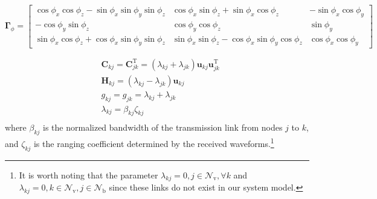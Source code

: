 \documentclass{IEEEtran}
\begin{document}
\begin{figure*}[!t]
\begin{equation}\label{eq13}
\boldsymbol{\Gamma}_{\phi}=
\begin{bmatrix}
\cos{\phi_x}\cos{\phi_z}-\sin{\phi_x}\sin{\phi_y}\sin{\phi_z} & \cos{\phi_x}\sin{\phi_z}+ \sin{\phi_x}\cos{\phi_z} & -\sin{\phi_x}\cos{\phi_y}\\
-\cos{\phi_y}\sin{\phi_z} & \cos{\phi_y}\cos{\phi_z} & \sin{\phi_y}\\
\sin{\phi_x}\cos{\phi_z}+ \cos{\phi_x}\sin{\phi_y}\sin{\phi_z}& \sin{\phi_x}\sin{\phi_z}- \cos{\phi_x}\sin{\phi_y}\cos{\phi_z} & \cos{\phi_x}\cos{\phi_y}
\end{bmatrix}
\end{equation}
\hrulefill
\vspace*{4pt}
\end{figure*}
\begin{equation}
\begin{aligned}
&\mathbf{C}_{kj}=\mathbf{C}_{jk}^{\text{T}}=(\lambda_{kj}+\lambda_{jk})\mathbf{u}_{kj}\mathbf{u}_{jk}^{\text{T}} \\
&\mathbf{H}_{kj}=(\lambda_{kj}-\lambda_{jk})\mathbf{u}_{kj}\\
&g_{kj}=g_{jk}=\lambda_{kj}+\lambda_{jk}\\
&\lambda_{kj}=\beta_{kj}\zeta_{kj}\\
\end{aligned}
\end{equation}
where $\beta_{kj}$ is the normalized bandwidth of the transmission link from nodes $j$ to $k$, and $\zeta_{kj}$ is the ranging coefficient determined by the received waveforms.\footnote{It is worth noting that the parameter $\lambda_{kj}=0,j\in\mathcal{N}_{\text{v}},\forall k$ and $\lambda_{kj}=0,k\in\mathcal{N}_{\text{v}},j\in\mathcal{N}_{\text{b}}$ since these links do not exist in our system model.}
\end{document}
